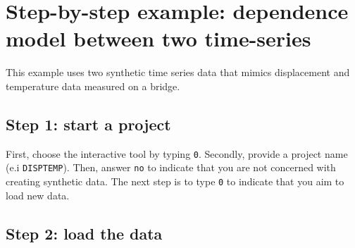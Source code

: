 \section{Step-by-step example: dependence model between two time-series}
\label{S:ExampleDispTemp}


This example uses two synthetic time series data that mimics displacement  and temperature data measured on a bridge. 

\subsection{Step 1: start a project}

First, choose the interactive tool by typing \colorbox{light-gray}{\lstinline[basicstyle = \mlttfamily \small, backgroundcolor = \color{light-gray}]!0!}.
Secondly, provide a project name (e.i \lstinline[basicstyle = \mlttfamily \small, backgroundcolor = \color{light-gray}]!DISPTEMP!).
Then, answer \colorbox{light-gray}{\lstinline[basicstyle = \mlttfamily \small, backgroundcolor = \color{light-gray}]!no!} to indicate that you are not concerned with creating synthetic data.
The next step is to type \colorbox{light-gray}{\lstinline[basicstyle = \mlttfamily \small, backgroundcolor = \color{light-gray}]!0!} to indicate that you aim to load new data.

\subsection{Step 2: load the data}

